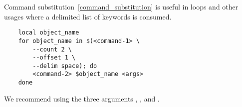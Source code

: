 Command substitution~\ref{command_substitution} is useful in  loops and other usages where a delimited list of keywords is consumed.
%
\begin{verbatim}
    local object_name
    for object_name in $(<command-1> \
        --count 2 \
        --offset 1 \
        --delim space); do
        <command-2> $object_name <args>
    done
\end{verbatim}
%
We recommend using the three arguments , , and .